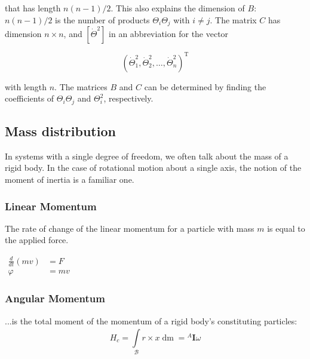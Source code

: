 that has length $n(n-1) / 2$. This also explains the dimension of $B$: $n(n-1) / 2$ is the number of products $\Theta_{i} \Theta_{j}$ with $i \neq j$. The matrix $C$ has dimension $n \times n$, and $\left[\dot{\Theta}^{2}\right]$ in an abbreviation for the vector
\begin{center}
$$\left(\dot{\Theta}_{1}^{2}, \dot{\Theta}_{2}^{2}, \ldots, \dot{\Theta}_{n}^{2}\right)^{\mathrm{T}}$$
\end{center}

with length $n$. The matrices $B$ and $C$ can be determined by finding the coefficients of $\Theta_{i} \Theta_{j}$ and $\Theta_{i}^{2}$, respectively.

\subsection{Mass distribution}
In systems with a single degree of freedom, we often talk about the mass of a rigid
body. In the case of rotational motion about a single axis, the notion of the moment
of inertia is a familiar one. 
\subsubsection{Linear Momentum}

The rate of change of the linear momentum for a particle with mass $m$ is equal to the applied force.

\begin{center}
$\begin{aligned}
	\frac{d}{d t}(m v) &= F \\
	\varphi &= mv
\end{aligned}$
\end{center}

\subsubsection{Angular Momentum}
...is the total moment of the momentum of a rigid body's constituting particles:
\[ H_c = \int\limits_{\mathcal{B}}^{} r \times x \mathop{d m} = {}^{A}\mathbf{I} \omega  \]

